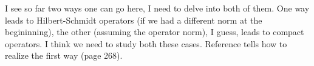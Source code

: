 \begin{fur}
I see so far two ways one can go here, I need to delve into both of them. One way leads to Hilbert-Schmidt operators (if we had a different norm at the begininning), the other (assuming the operator norm), I guess, leads to compact operators. I think we need to study both these cases. Reference \cite{conway} tells how to realize the first way (page 268).
\end{fur}

%
%
